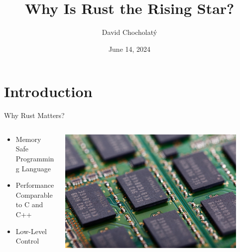 \documentclass[10pt]{beamer}
\title{Why Is Rust the Rising Star?}
\author{David Chocholatý}
\institute{Brno University of Technology}
\date{June 14, 2024}
\begin{document}
\maketitle


\section[Why Rust Matters?]{Introduction}

\begin{frame}{Why Rust Matters?}
\begin{columns}
\begin{column}{0.5\textwidth}
    \begin{itemize}
    \setlength\itemsep{1em}
    \item Memory Safe Programming Language
    \pause
    \item Performance Comparable to C and C++
    \pause
    \item Low-Level Control
    \end{itemize}
\end{column}
\begin{column}{0.5\textwidth}  %
    \onslide
    \begin{center}
     \includegraphics[width=0.9\textwidth]{img/board-22098_1280.jpg}
     \end{center}
\end{column}
\end{columns}
\end{frame}
\end{document}
